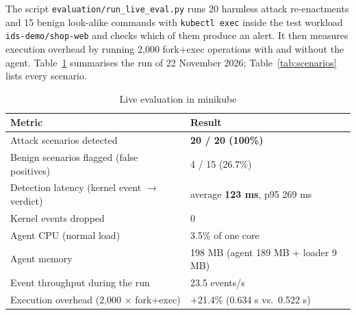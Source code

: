 The script \texttt{evaluation/run\_live\_eval.py} runs 20 harmless attack re-enactments
and 15 benign look-alike commands with \texttt{kubectl exec} inside the test workload
\texttt{ids-demo/shop-web} and checks which of them produce an alert. It then measures
execution overhead by running 2,000 fork+exec operations with and without the agent.
Table~\ref{tab:live} summarises the run of 22 November 2026; Table~\ref{tab:scenarios}
lists every scenario.

\begin{table}[H]
\centering
\caption{Live evaluation in minikube}
\label{tab:live}
\small
\begin{tabular}{ll}
\toprule
\textbf{Metric} & \textbf{Result} \\
\midrule
Attack scenarios detected & \textbf{20 / 20 (100\%)} \\
Benign scenarios flagged (false positives) & 4 / 15 (26.7\%) \\
Detection latency (kernel event $\rightarrow$ verdict) & average \textbf{123 ms}, p95 269 ms \\
Kernel events dropped & 0 \\
Agent CPU (normal load) & 3.5\% of one core \\
Agent memory & 198 MB (agent 189 MB + loader 9 MB) \\
Event throughput during the run & 23.5 events/s \\
Execution overhead (2,000 $\times$ fork+exec) & +21.4\% (0.634 s vs.\ 0.522 s) \\
\bottomrule
\end{tabular}
\end{table}

